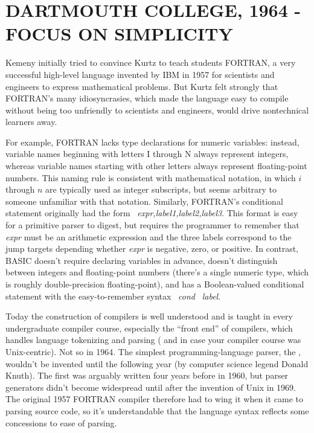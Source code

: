 
\section{DARTMOUTH COLLEGE, 1964 - FOCUS ON SIMPLICITY}


Kemeny initially tried to convince Kurtz to teach students FORTRAN, a
very successful high-level language invented by IBM in 1957 for
scientists and engineers to express mathematical problems.
But Kurtz felt strongly that FORTRAN's many idiosyncrasies, which made
the language easy to compile without being too unfriendly to scientists
and engineers, would drive
nontechnical learners away.

For example, FORTRAN lacks type declarations for numeric
variables: instead,
variable names beginning with letters I through N always represent
integers, whereas variable names starting with other letters always
represent floating-point numbers.
This naming rule is consistent with mathematical notation, in which
$i$ through $n$ are typically used as integer subscripts, but seems
arbitrary to someone unfamiliar with that notation.
Similarly, FORTRAN's conditional statement originally had the form
~\emph{expr,label1,label2,label3}.  This format is easy 
for a primitive parser to digest,
but requires the programmer to remember that \emph{expr} must
be an arithmetic expression and the three labels 
correspond to the jump targets depending whether
\emph{expr} is negative, zero, or positive.  
In contrast, BASIC  doesn't require declaring variables in advance, 
doesn't distinguish between
integers and floating-point numbers (there's a single numeric type,
which is roughly double-precision floating-point), and
has a Boolean-valued conditional
statement with the easy-to-remember syntax ~\emph{cond}
~\emph{label}.

\begin{tangent}
Today the construction of compilers is well understood and is taught in
every undergraduate compiler course, especially the
``front end'' of compilers, which handles language tokenizing and
parsing ( and  in case your compiler course was
Unix-centric).  Not so in 1964.  The simplest programming-language
parser, the 
, wouldn't be invented
until the following year (by computer science legend Donald Knuth).  The first
 was arguably written four years before in 1960, but
parser generators didn't 
become widespread until after the invention of Unix in 1969.  The
original 1957 FORTRAN compiler therefore had to wing it when it came to
parsing source code, so it's understandable that the language syntax
reflects some concessions to ease of parsing.
\end{tangent}

